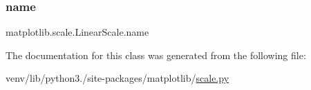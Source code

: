 \subsubsection{\texorpdfstring{name}{name}}
{\footnotesize\ttfamily matplotlib.\+scale.\+Linear\+Scale.\+name\hspace{0.3cm}{\ttfamily [static]}}



The documentation for this class was generated from the following file\+:\begin{DoxyCompactItemize}
\item 
venv/lib/python3./site-\/packages/matplotlib/\hyperlink{scale_8py}{scale.\+py}\end{DoxyCompactItemize}
